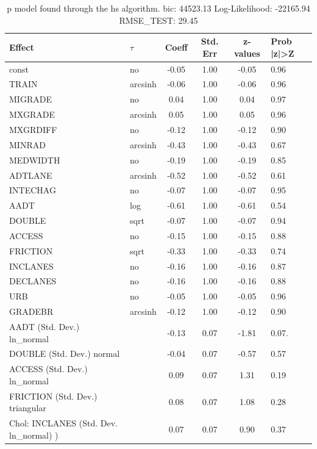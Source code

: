 \begin{table}
	\caption{p model found through the hs algorithm. bic: 44523.13 Log-Likelihood: -22165.94 RMSE_TEST: 29.45}
	\begin{center}
		\begin{tabular}{|l|l|c|c|c|l|}
			\hline
			Effect & $\tau$ & Coeff & Std. Err & z-values & Prob |z|>Z \\
			\hline
			const & no & -0.05 & 1.00 & -0.05 & 0.96 \\
			\hline
			TRAIN & arcsinh & -0.06 & 1.00 & -0.06 & 0.96 \\
			\hline
			MIGRADE & no & 0.04 & 1.00 & 0.04 & 0.97 \\
			\hline
			MXGRADE & arcsinh & 0.05 & 1.00 & 0.05 & 0.96 \\
			\hline
			MXGRDIFF & no & -0.12 & 1.00 & -0.12 & 0.90 \\
			\hline
			MINRAD & arcsinh & -0.43 & 1.00 & -0.43 & 0.67 \\
			\hline
			MEDWIDTH & no & -0.19 & 1.00 & -0.19 & 0.85 \\
			\hline
			ADTLANE & arcsinh & -0.52 & 1.00 & -0.52 & 0.61 \\
			\hline
			INTECHAG & no & -0.07 & 1.00 & -0.07 & 0.95 \\
			\hline
			AADT & log & -0.61 & 1.00 & -0.61 & 0.54 \\
			\hline
			DOUBLE & sqrt & -0.07 & 1.00 & -0.07 & 0.94 \\
			\hline
			ACCESS & no & -0.15 & 1.00 & -0.15 & 0.88 \\
			\hline
			FRICTION & sqrt & -0.33 & 1.00 & -0.33 & 0.74 \\
			\hline
			INCLANES & no & -0.16 & 1.00 & -0.16 & 0.87 \\
			\hline
			DECLANES & no & -0.16 & 1.00 & -0.16 & 0.88 \\
			\hline
			URB & no & -0.05 & 1.00 & -0.05 & 0.96 \\
			\hline
			GRADEBR & arcsinh & -0.12 & 1.00 & -0.12 & 0.90 \\
			\hline
			AADT (Std. Dev.) ln_normal &  & -0.13 & 0.07 & -1.81 & 0.07. \\
			\hline
			DOUBLE (Std. Dev.) normal &  & -0.04 & 0.07 & -0.57 & 0.57 \\
			\hline
			ACCESS (Std. Dev.) ln_normal &  & 0.09 & 0.07 & 1.31 & 0.19 \\
			\hline
			FRICTION (Std. Dev.) triangular &  & 0.08 & 0.07 & 1.08 & 0.28 \\
			\hline
			 Chol: INCLANES (Std. Dev. ln_normal) ) &  & 0.07 & 0.07 & 0.90 & 0.37 \\

\end{tabular}
\end{center}
\end{table}
